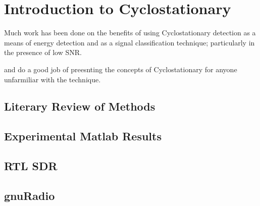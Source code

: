 \chapter{Introduction to Cyclostationary}

Much work has been done on the benefits of using Cyclostationary detection as a
means of energy detection and as a signal classification
technique; particularly in the presence of low SNR.  


\cite{costa96} and \cite{kim2007} do a good job of preesnting the concepts of
Cyclostationary for anyone unfarmiliar with the technique.  

\section{Literary Review of Methods}
\section{Experimental Matlab Results}
\section{RTL SDR}
\section{gnuRadio}

